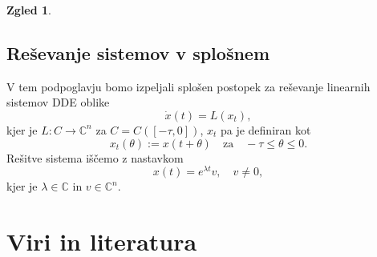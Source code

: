 \documentclass[12pt,a4paper]{amsart}
\theoremstyle{definition} %
\newtheorem{zgled}[definicija]{Zgled}
\theoremstyle{plain} %
\newcommand{\C}{\mathbb C}
\begin{document}
\begin{zgled}
\subsection{Reševanje sistemov v splošnem}
V tem podpoglavju bomo izpeljali splošen postopek za reševanje linearnih sistemov DDE oblike 
\[\dot{x}(t)=L(x_t),\]
kjer je $L:C\to\C^n$ za $C=C([-\tau,0])$, $x_t$ pa je definiran kot 
\[x_t(\theta):=x(t+\theta) \quad \text{za} \quad -\tau\leq\theta\leq0.\]
Rešitve sistema iščemo z nastavkom 
\[x(t)=e^{\lambda t}v, \quad v\neq0,\]
kjer je $\lambda\in\C$ in  $v\in\C^n$.

\end{zgled}

\section{Viri in literatura}

\printbibliography
\end{document}
